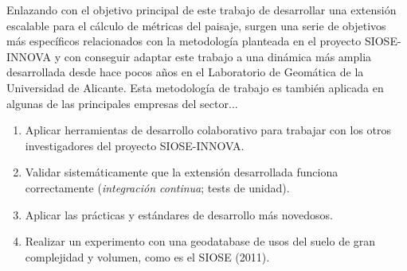 Enlazando con el objetivo principal de este trabajo de desarrollar una extensión escalable para el cálculo de métricas del paisaje, surgen una serie de objetivos más específicos relacionados con la metodología planteada en el proyecto SIOSE-INNOVA y con conseguir adaptar este trabajo a una dinámica más amplia desarrollada desde hace pocos años en el Laboratorio de Geomática de la Universidad de Alicante. Esta metodología de trabajo es también aplicada en algunas de las principales empresas del sector...

\begin{enumerate}
\item Aplicar herramientas de desarrollo colaborativo para trabajar con los otros investigadores del proyecto SIOSE-INNOVA.
\item Validar sistemáticamente que la extensión desarrollada funciona correctamente (\textit{integración continua}; tests de unidad).
\item Aplicar las prácticas y estándares de desarrollo más novedosos.
\item Realizar un experimento con una geodatabase de usos del suelo de gran complejidad y volumen, como es el SIOSE (2011).
\end{enumerate}





